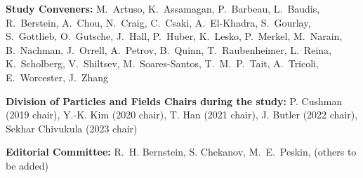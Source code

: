 
{\large {\bf Study Conveners:} M.~Artuso, K.~Assamagan, P.~Barbeau, L.~Baudis,  R.~Berstein, A.~Chou,
N.~Craig, C.~Csaki,  A.~El-Khadra, S.~Gourlay, S.~Gottlieb,
O.~Gutsche, J.~Hall, P.~Huber, K.~Lesko, P.~Merkel, 
M.~Narain, B.~Nachman, J.~Orrell,  A.~Petrov,  B.~Quinn, T.~Raubenheimer, L.~Reina, K.~Scholberg,
V.~Shiltsev,  M.~Soares-Santos,
T.~M.~P.~Tait, A.~Tricoli, 
E.~Worcester,  J.~Zhang}\\
\vspace{1cm}

{\large {\bf Division of Particles and Fields Chairs during the study:}
P. Cushman (2019 chair), Y.-K. Kim  (2020 chair), T. Han (2021 chair),
J. Butler (2022 chair),\\  Sekhar Chivukula (2023 chair)} \\   

\vspace{1cm}

{\large {\bf  Editorial Committee:}
R.~H. Bernstein,
S. Chekanov, 
M.~E.~Peskin,
 (others to be added)}
